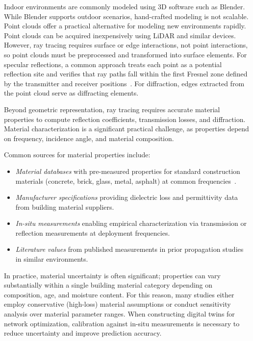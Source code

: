 Indoor environments are commonly modeled using 3D software such as Blender. While Blender supports outdoor scenarios, hand-crafted modeling is not scalable. Point clouds offer a practical alternative for modeling new environments rapidly. Point clouds can be acquired inexpensively using LiDAR and similar devices. However, ray tracing requires surface or edge interactions, not point interactions, so point clouds must be preprocessed and transformed into surface elements. For specular reflections, a common approach treats each point as a potential reflection site and verifies that ray paths fall within the first Fresnel zone defined by the transmitter and receiver positions~. For diffraction, edges extracted from the point cloud serve as diffracting elements.

Beyond geometric representation, ray tracing requires accurate material properties to compute reflection coefficients, transmission losses, and diffraction. Material characterization is a significant practical challenge, as properties depend on frequency, incidence angle, and material composition.

Common sources for material properties include:
\begin{itemize}
  \item \emph{Material databases} with pre-measured properties for standard construction materials (concrete, brick, glass, metal, asphalt) at common frequencies~.
  \item \emph{Manufacturer specifications} providing dielectric loss and permittivity data from building material suppliers.
  \item \emph{In-situ measurements} enabling empirical characterization via transmission or reflection measurements at deployment frequencies.
  \item \emph{Literature values} from published measurements in prior propagation studies in similar environments.
\end{itemize}

In practice, material uncertainty is often significant; properties can vary substantially within a single building material category depending on composition, age, and moisture content. For this reason, many studies either employ conservative (high-loss) material assumptions or conduct sensitivity analysis over material parameter ranges. When constructing digital twins for network optimization, calibration against in-situ measurements is necessary to reduce uncertainty and improve prediction accuracy.

